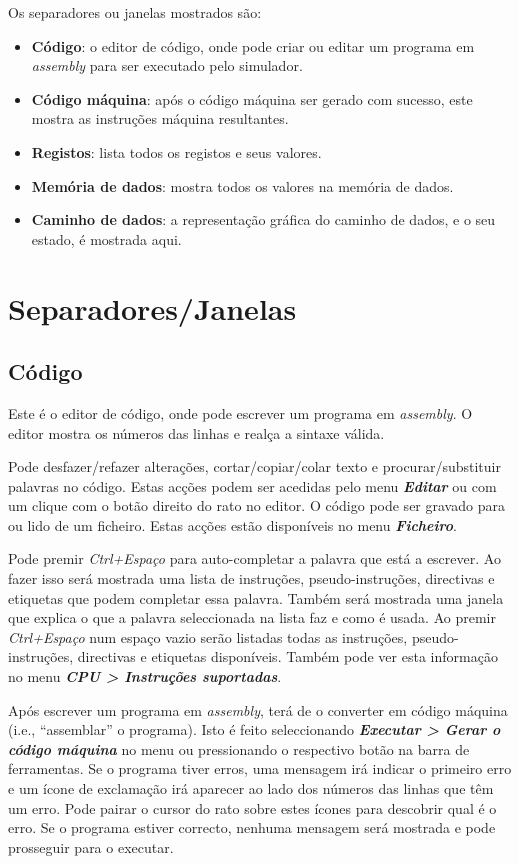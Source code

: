 \documentclass[11pt,a4paper,twoside,titlepage]{report}
\newcommand{\menupath}[1]{\textbf{\emph{#1}}}
\begin{document}
Os separadores ou janelas mostrados são:
\begin{itemize}
	\item \textbf{Código}: o editor de código, onde pode criar ou editar um
		programa em \emph{assembly} para ser executado pelo simulador.
	\item \textbf{Código máquina}: após o código máquina ser gerado com sucesso,
		este mostra as instruções máquina resultantes.
	\item \textbf{Registos}: lista todos os registos e seus valores.
	\item \textbf{Memória de dados}: mostra todos os valores na memória de 
		dados.
	\item \textbf{Caminho de dados}: a representação gráfica do caminho de
		dados, e o seu estado, é mostrada aqui.
\end{itemize}


\chapter{Separadores/Janelas} \label{ch:tabs_windows}

\section{Código}

Este é o editor de código, onde pode escrever um programa em \emph{assembly}.
O editor mostra os números das linhas e realça a sintaxe válida.

Pode desfazer/refazer alterações, cortar/copiar/colar texto e 
procurar/substituir palavras no código. Estas acções podem ser acedidas pelo
menu \menupath{Editar} ou com um clique com o botão direito do rato no editor.
O código pode ser gravado para ou lido de um ficheiro. Estas acções estão
disponíveis no menu \menupath{Ficheiro}.

Pode premir \emph{Ctrl+Espaço} para auto-completar a palavra que está a escrever.
Ao fazer isso será mostrada uma lista de instruções, pseudo-instruções,
directivas e etiquetas que podem completar essa palavra.
Também será mostrada uma janela que explica o que a palavra seleccionada na lista
faz e como é usada.
Ao premir \emph{Ctrl+Espaço} num espaço vazio serão listadas todas as instruções,
pseudo-instruções, directivas e etiquetas disponíveis.
Também pode ver esta informação no menu \menupath{CPU > Instruções suportadas}.

Após escrever um programa em \emph{assembly}, terá de o converter em código máquina
(i.e., ``assemblar'' o programa).
Isto é feito seleccionando \menupath{Executar > Gerar o código máquina} no menu ou
pressionando o respectivo botão na barra de ferramentas.
Se o programa tiver erros, uma mensagem irá indicar o primeiro erro e um ícone de
exclamação irá aparecer ao lado dos números das linhas que têm um erro.
Pode pairar o cursor do rato sobre estes ícones para descobrir qual é o erro.
Se o programa estiver correcto, nenhuma mensagem será mostrada e pode prosseguir
para o executar.
\end{document}
